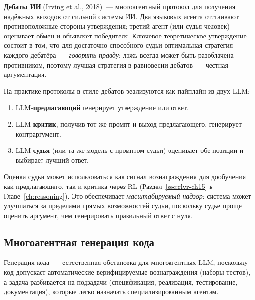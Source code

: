 \textbf{Дебаты ИИ} (Irving et al., 2018)~---
многоагентный протокол для получения надёжных выходов от
сильной системы ИИ. Два языковых агента отстаивают противоположные стороны
утверждения; третий агент (или судья-человек) оценивает
обмен и объявляет победителя. Ключевое теоретическое утверждение состоит в том, что
для достаточно способного судьи оптимальная стратегия каждого дебатёра~---
\emph{говорить правду}: ложь всегда может быть разоблачена
противником, поэтому лучшая стратегия в равновесии дебатов~--- честная аргументация.

На практике протоколы в стиле дебатов реализуются как пайплайн из двух LLM:
\begin{enumerate}[leftmargin=*]
  \item LLM-\textbf{предлагающий} генерирует утверждение или ответ.
  \item LLM-\textbf{критик}, получив тот же промпт и выход
    предлагающего, генерирует контраргумент.
  \item LLM-\textbf{судья} (или та же модель с промптом судьи)
    оценивает обе позиции и выбирает лучший ответ.
\end{enumerate}
Оценка судьи может использоваться как сигнал вознаграждения для дообучения как
предлагающего, так и критика через RL (Раздел~\ref{sec:rlvr-ch15} в
Главе~\ref{ch:reasoning}). Это обеспечивает \emph{масштабируемый надзор}:
система может улучшаться за пределами прямых возможностей судьи,
поскольку судье проще оценить аргумент, чем
генерировать правильный ответ с нуля.

\subsection{Многоагентная генерация кода}

Генерация кода~--- естественная обстановка для многоагентных LLM, поскольку
код допускает автоматические верифицируемые вознаграждения (наборы тестов), а
задача разбивается на подзадачи (спецификация, реализация,
тестирование, документация), которые легко назначать специализированным агентам.

